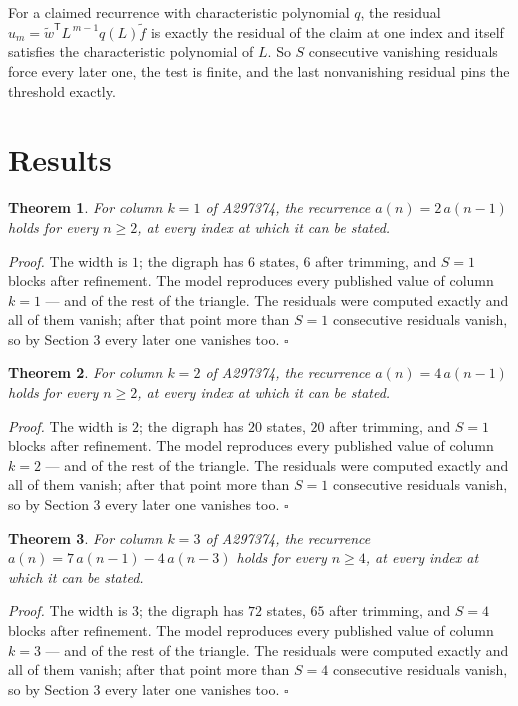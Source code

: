 \documentclass[11pt]{article}
\newtheorem{theorem}{Theorem}
\theoremstyle{definition}
\begin{document}
For a claimed recurrence with characteristic polynomial $q$, the residual $u_m = \tilde w^{\mathsf T}L^{\,m-1}q(L)\tilde f$ is exactly the residual of the claim at one index and itself satisfies the characteristic polynomial of $L$. So $S$ consecutive vanishing residuals force every later one, the test is finite, and the last nonvanishing residual pins the threshold exactly.

\section{Results}

\begin{theorem} For column $k = 1$ of A297374, the recurrence $a(n) = 2\,a(n-1)$ holds for every $n \ge 2$, at every index at which it can be stated.\end{theorem}

{\itshape Proof.} The width is $1$; the digraph has $6$ states, $6$ after trimming, and $S = 1$ blocks after refinement. The model reproduces every published value of column $k = 1$ --- and of the rest of the triangle. The residuals were computed exactly and all of them vanish; after that point more than $S = 1$ consecutive residuals vanish, so by Section 3 every later one vanishes too. $\square$

\begin{theorem} For column $k = 2$ of A297374, the recurrence $a(n) = 4\,a(n-1)$ holds for every $n \ge 2$, at every index at which it can be stated.\end{theorem}

{\itshape Proof.} The width is $2$; the digraph has $20$ states, $20$ after trimming, and $S = 1$ blocks after refinement. The model reproduces every published value of column $k = 2$ --- and of the rest of the triangle. The residuals were computed exactly and all of them vanish; after that point more than $S = 1$ consecutive residuals vanish, so by Section 3 every later one vanishes too. $\square$

\begin{theorem} For column $k = 3$ of A297374, the recurrence $a(n) = 7\,a(n-1) - 4\,a(n-3)$ holds for every $n \ge 4$, at every index at which it can be stated.\end{theorem}

{\itshape Proof.} The width is $3$; the digraph has $72$ states, $65$ after trimming, and $S = 4$ blocks after refinement. The model reproduces every published value of column $k = 3$ --- and of the rest of the triangle. The residuals were computed exactly and all of them vanish; after that point more than $S = 4$ consecutive residuals vanish, so by Section 3 every later one vanishes too. $\square$
\end{document}
